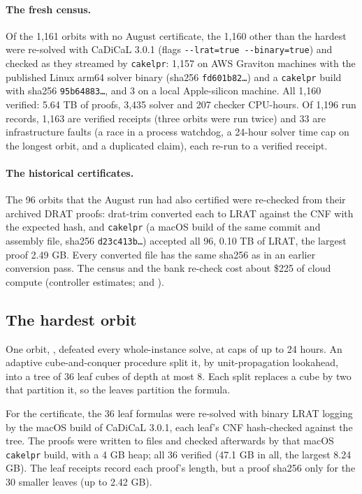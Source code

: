 \documentclass{anvil-paper}
\newcommand{\repobase}{https://github.com/rjwalters/lean-genius/blob/fa2b41268df024128ed4738b3bb500637cf1ec12}
\newcommand{\repofile}[2]{\href{\repobase/#1}{\lean{#2}}}
\newcommand{\rp}{research/problems/erdos-85-wip-01}
\newcommand{\cakelpr}{\texttt{cake\textunderscore lpr}}
\theoremstyle{definition}
\begin{document}
\paragraph{The fresh census.} Of the 1,161 orbits with no August certificate, the 1,160 other than the hardest were re-solved with CaDiCaL 3.0.1 (flags \texttt{-{}-lrat=true -{}-binary=true}) and checked as they streamed by \cakelpr{}: 1,157 on AWS Graviton machines with the published Linux arm64 solver binary (sha256 \texttt{fd601b82\ldots}) and a \cakelpr{} build with sha256 \texttt{95b64883\ldots}, and 3 on a local Apple-silicon machine. All 1,160 verified: 5.64 TB of proofs, 3,435 solver and 207 checker CPU-hours. Of 1,196 run records, 1,163 are verified receipts (three orbits were run twice) and 33 are infrastructure faults (a race in a process watchdog, a 24-hour solver time cap on the longest orbit, and a duplicated claim), each re-run to a verified receipt.

\paragraph{The historical certificates.} The 96 orbits that the August run had also certified were re-checked from their archived DRAT proofs: drat-trim converted each to LRAT against the CNF with the expected hash, and \cakelpr{} (a macOS build of the same commit and assembly file, sha256 \texttt{d23c413b\ldots}) accepted all 96, 0.10 TB of LRAT, the largest proof 2.49 GB. Every converted file has the same sha256 as in an earlier conversion pass. The census and the bank re-check cost about \$225 of cloud compute (controller estimates; \repofile{\rp/h1_cert_full_20261001/receipts/README.md}{census receipts} and \repofile{\rp/h1_bank_check_20261006/receipts/README.md}{bank receipts}).

\subsection{The hardest orbit}\label{sec:cube}

One orbit, , defeated every whole-instance solve, at caps of up to 24 hours. An adaptive cube-and-conquer procedure split it, by unit-propagation lookahead, into a tree of 36 leaf cubes of depth at most 8. Each split replaces a cube by two that partition it, so the leaves partition the formula.

For the certificate, the 36 leaf formulas were re-solved with binary LRAT logging by the macOS build of CaDiCaL 3.0.1, each leaf's CNF hash-checked against the tree. The proofs were written to files and checked afterwards by that macOS \cakelpr{} build, with a 4 GB heap; all 36 verified (47.1 GB in all, the largest 8.24 GB). The leaf receipts record each proof's length, but a proof sha256 only for the 30 smaller leaves (up to 2.42 GB).
\end{document}
